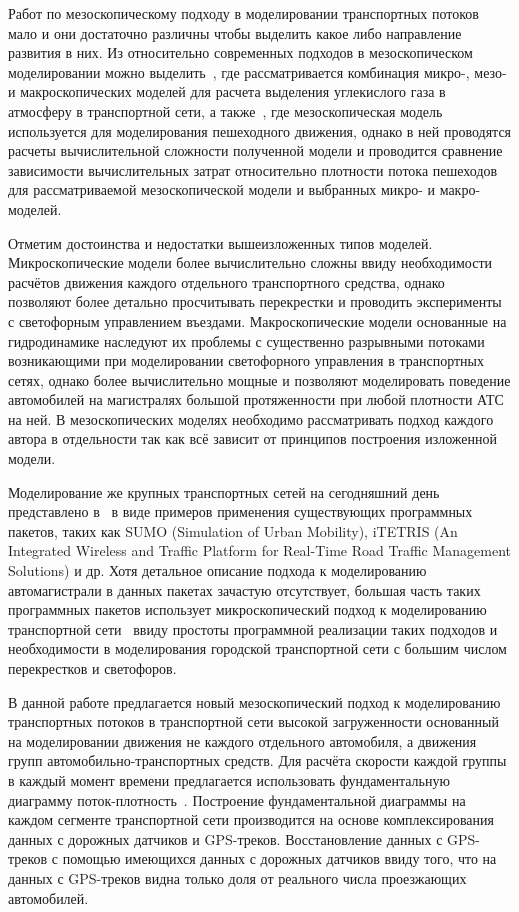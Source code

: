 Работ по мезоскопическому подходу в моделировании транспортных потоков мало и они достаточно различны чтобы выделить какое либо направление развития в них.
Из относительно современных подходов в мезоскопическом моделировании можно выделить~\autocite{oskarbski2018applying}, где рассматривается комбинация микро-, мезо- и макроскопических моделей для расчета выделения углекислого газа в атмосферу в транспортной сети, а также~\autocite{tordeux2018mesoscopic}, где мезоскопическая модель используется для моделирования пешеходного движения, однако в ней проводятся расчеты вычислительной сложности полученной модели и проводится сравнение зависимости вычислительных затрат относительно плотности потока пешеходов для рассматриваемой мезоскопической модели и выбранных микро- и макро- моделей.

Отметим достоинства и недостатки вышеизложенных типов моделей.
Микроскопические модели более вычислительно сложны ввиду необходимости расчётов движения каждого отдельного транспортного средства, однако позволяют более детально просчитывать перекрестки и проводить эксперименты с светофорным управлением въездами.
Макроскопические модели основанные на гидродинамике наследуют их проблемы с существенно разрывными потоками возникающими при моделировании светофорного управления в транспортных сетях, однако более вычислительно мощные и позволяют моделировать поведение автомобилей на магистралях большой протяженности при любой плотности АТС на ней.
В мезоскопических моделях необходимо рассматривать подход каждого автора в отдельности так как всё зависит от принципов построения изложенной модели.

Моделирование же крупных транспортных сетей на сегодняшний день представлено в~\autocite{asano2015traffic, bieker2015traffic} в
виде примеров применения существующих программных пакетов, таких как SUMO (Simulation of Urban Mobility),
iTETRIS (An Integrated Wireless and Traffic Platform for Real-Time Road Traffic Management Solutions) и др.
Хотя детальное описание подхода к моделированию автомагистрали в данных пакетах зачастую отсутствует, большая часть таких программных пакетов использует микроскопический подход к моделированию транспортной сети~\autocite{ratrout2009comparative} ввиду простоты программной реализации таких подходов и необходимости в моделирования городской транспортной сети с большим числом перекрестков и светофоров.

В данной работе предлагается новый мезоскопический подход к моделированию транспортных потоков в транспортной сети высокой загруженности основанный на моделировании движения не каждого отдельного автомобиля, а движения групп автомобильно-транспортных средств.
Для расчёта скорости каждой группы в каждый момент времени предлагается использовать фундаментальную диаграмму поток-плотность~\autocite{collectiveArticle2}.
Построение фундаментальной диаграммы на каждом сегменте транспортной сети производится на основе комплексирования данных с дорожных датчиков и GPS-треков.
Восстановление данных с GPS-треков с помощью имеющихся данных с дорожных датчиков ввиду того, что на данных с GPS-треков видна только доля от реального числа проезжающих автомобилей.


